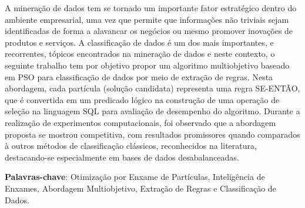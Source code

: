 \begin{resumo}
A mineração de dados tem se tornado um importante fator estratégico dentro do ambiente empresarial, uma vez que permite que informações não triviais sejam identificadas de forma a alavancar os negócios ou mesmo promover inovações de produtos e serviços. A classificação de dados é um dos mais importantes, e recorrentes, tópicos encontrados na mineração de dados e neste contexto, o seguinte trabalho tem por objetivo propor um algoritmo multiobjetivo baseado em PSO para classificação de dados por meio de extração de regras. Nesta abordagem, cada partícula (solução candidata) representa uma regra SE-ENTÃO, que é convertida em um predicado lógico na construção de uma operação de seleção na linguagem SQL para avaliação de desempenho do algoritmo. Durante a realização de experimentos computacionais, foi observado que a abordagem proposta se mostrou competitiva, com resultados promissores quando comparados à outros métodos de classificação clássicos, reconhecidos na literatura, destacando-se especialmente em bases de dados desabalanceadas. 

\vspace{1.5ex}

\noindent \textbf{Palavras-chave}: Otimização por Enxame de Partículas, Inteligência de Enxames, Abordagem Multiobjetivo, Extração de Regras e Classificação de Dados. 
\end{resumo}
